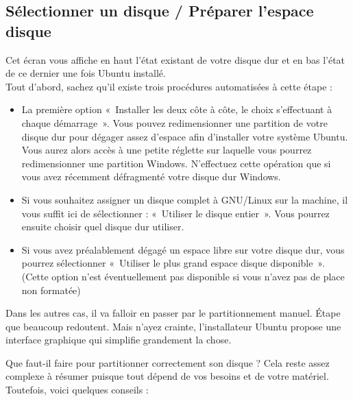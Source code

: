 \subsection{Sélectionner un disque / Préparer l'espace disque}
\label{RefFormatPartition}
Cet écran vous affiche en haut l'état existant de votre disque dur et en bas l'état de ce dernier une fois Ubuntu installé.\\
Tout d'abord, sachez qu'il existe trois procédures automatisées à cette étape :
\begin{itemize}
\item La première option «~Installer les deux côte à côte, le choix s'effectuant à chaque démarrage~». Vous pouvez redimensionner une partition de votre disque dur pour dégager assez d'espace afin d'installer votre système Ubuntu. Vous aurez alors accès à une petite réglette sur laquelle vous pourrez redimensionner une partition Windows. N'effectuez cette opération que si vous avez récemment défragmenté votre disque dur Windows.
\item Si vous souhaitez assigner un disque complet à GNU/Linux sur la machine, il vous suffit ici de sélectionner : «~Utiliser le disque entier~». Vous pourrez ensuite choisir quel disque dur utiliser.
\item Si vous avez préalablement dégagé un espace libre sur votre disque dur, vous pourrez sélectionner «~Utiliser le plus grand espace disque disponible~». (Cette option n'est éventuellement pas disponible si vous n'avez pas de place non formatée)
\end{itemize}\par
{}
Dans les autres cas, il va falloir en passer par le partitionnement manuel. Étape que beaucoup redoutent. Mais n'ayez crainte, l'installateur Ubuntu propose une interface graphique qui simplifie grandement la chose.\par
Que faut-il faire pour partitionner correctement son disque ? Cela reste assez complexe à résumer puisque tout dépend de vos besoins et de votre matériel. Toutefois, voici quelques conseils :
